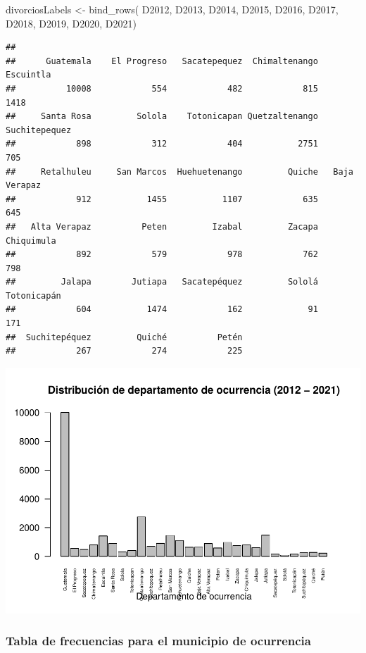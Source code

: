 \documentclass[
]{article}
\newenvironment{Shaded}{\begin{snugshade}}{\end{snugshade}}
\newcommand{\FunctionTok}[1]{\textcolor[rgb]{0.00,0.00,0.00}{#1}}
\newcommand{\NormalTok}[1]{#1}
\newcommand{\OtherTok}[1]{\textcolor[rgb]{0.56,0.35,0.01}{#1}}
\begin{document}
\begin{Shaded}
\begin{Highlighting}[]
\NormalTok{divorciosLabels }\OtherTok{\textless{}{-}} \FunctionTok{bind\_rows}\NormalTok{( D2012, D2013, D2014, D2015, D2016, D2017, D2018, D2019, D2020, D2021)}
\end{Highlighting}
\end{Shaded}

\begin{verbatim}
## 
##      Guatemala    El Progreso   Sacatepequez  Chimaltenango      Escuintla 
##          10008            554            482            815           1418 
##     Santa Rosa         Solola    Totonicapan Quetzaltenango  Suchitepequez 
##            898            312            404           2751            705 
##     Retalhuleu     San Marcos  Huehuetenango         Quiche   Baja Verapaz 
##            912           1455           1107            635            645 
##   Alta Verapaz          Peten         Izabal         Zacapa     Chiquimula 
##            892            579            978            762            798 
##         Jalapa        Jutiapa   Sacatepéquez         Sololá    Totonicapán 
##            604           1474            162             91            171 
##  Suchitepéquez         Quiché          Petén 
##            267            274            225
\end{verbatim}

\includegraphics{Proyecto_files/figure-latex/frecuenciaDepartamento-1.pdf}

\hypertarget{tabla-de-frecuencias-para-el-municipio-de-ocurrencia}{%
\subsubsection{Tabla de frecuencias para el municipio de
ocurrencia}\label{tabla-de-frecuencias-para-el-municipio-de-ocurrencia}}
\end{document}
